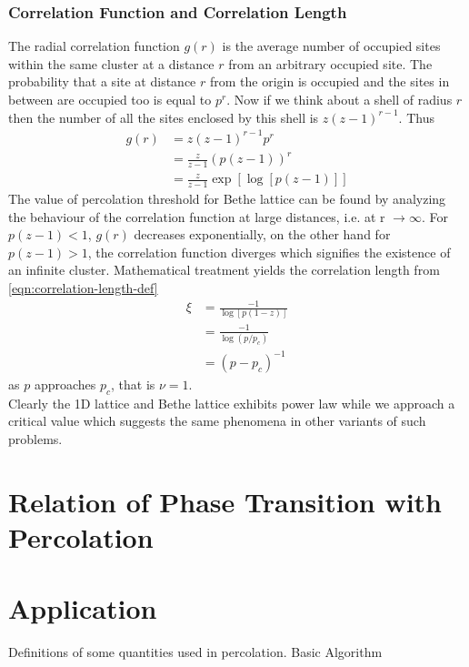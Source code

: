	\subsubsection{Correlation Function and Correlation Length}
	The radial correlation function $g(r)$ is the average number of occupied sites within the same cluster at a distance $r$ from an arbitrary occupied site. The probability that a site at distance $r$ from the origin is occupied and the sites in between are occupied too is equal to $p^r$. Now if we think about a shell of radius $r$ then the number of all the sites enclosed by this shell is $z(z-1)^{r-1}$. Thus
	\begin{align}
		g(r) &= z(z-1)^{r-1} p^r \\
			 &= \frac{z}{z-1} \left(p(z-1)\right)^r \\
			 &= \frac{z}{z-1} \exp \left[\log\left[p(z-1)\right]\right]
	\end{align}
	The value of percolation threshold for Bethe lattice can be found by analyzing the behaviour of the correlation function at large distances, i.e. at r $\rightarrow \infty$. For $p(z-1) < 1$, $g(r)$ decreases exponentially, on the other hand for $p(z-1)>1$, the correlation function diverges which signifies the existence of an infinite cluster. Mathematical treatment yields the correlation length from \ref{eqn:correlation-length-def}
	\begin{align}
		\xi &= \frac{-1}{\log[p(1-z)]} \nonumber \\
			&= \frac{-1}{\log(p/p_c)} \nonumber \\
			&= (p-p_c)^{-1}
	\end{align}
	as $p$ approaches $p_c$, that is $\nu = 1$. \\
	Clearly the 1D lattice and Bethe  lattice exhibits power law while we approach a critical value which suggests the same phenomena in other variants of such problems.
	
\section{Relation of Phase Transition with Percolation}

\section{Application}
	
Definitions of some quantities used in percolation.
Basic Algorithm
